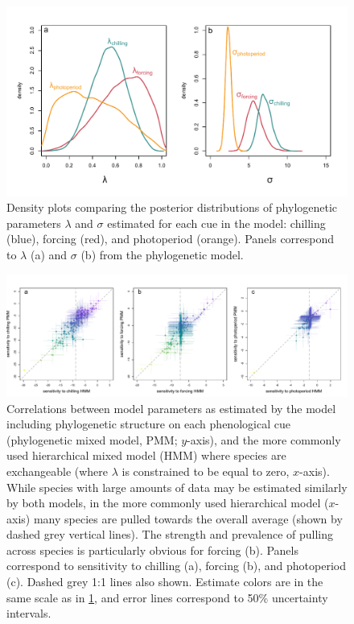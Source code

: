 \documentclass[11pt]{article}
\begin{document}
\clearpage

\begin{figure} 
  \begin{center}
  \includegraphics[width=14cm]{../../analyses/phylogeny/figures/Fig2_lambdas_sigmas.pdf}
  \caption{Density plots comparing the posterior distributions of phylogenetic parameters $\lambda$ and $\sigma$ estimated for each cue in the model: chilling (blue), forcing (red), and photoperiod (orange). Panels correspond to $\lambda$ (a) and $\sigma$ (b) from the phylogenetic model.}
  \label{fig:phylosig_all}
  \end{center}
\end{figure}

\begin{figure} 
  \begin{center}
  \includegraphics[width=14cm]{../../analyses/phylogeny/figures/Fig3_correlations_lambestvslamb0_cols.pdf}
  \caption{Correlations between model parameters as estimated by the model including phylogenetic structure on each phenological cue (phylogenetic mixed model, PMM; $y$-axis), and the more commonly used hierarchical mixed model (HMM) where species are exchangeable (where $\lambda$ is constrained to be equal to zero, $x$-axis). While species with large amounts of data may be estimated similarly by both models, in the more commonly used hierarchical model ($x$-axis) many species are pulled towards the overall average (shown by dashed grey vertical lines). The strength and prevalence of pulling across species is particularly obvious for forcing (b). Panels correspond to sensitivity to chilling (a), forcing (b), and photoperiod (c). Dashed grey 1:1 lines also shown. Estimate colors are in the same scale as in \ref{fig:phylosig_all}, and error lines correspond to 50\% uncertainty intervals.}
  \label{fig:correls_angio}
  \end{center}
\end{figure}
\end{document}
